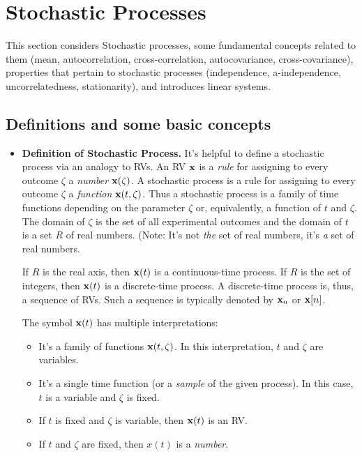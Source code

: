 \documentclass[a4paper, oneside]{book}
\begin{document}
\chapter{Stochastic Processes}

This section considers Stochastic processes, some fundamental concepts related to them (mean, autocorrelation, cross-correlation, autocovariance, cross-covariance), properties that pertain to stochastic processes (independence, a-independence, uncorrelatedness, stationarity), and introduces linear systems. 

\section{Definitions and some basic concepts}
\begin{itemize}
\item \textbf{Definition of Stochastic Process.} It's helpful to define a stochastic process via an analogy to RVs. An RV $\mathbf x$ is a \textit{rule} for assigning to every outcome $\zeta$ a \textit{number} $\mathbf x(\zeta)$. A stochastic process is a rule for assigning to every outcome $\zeta$ a \textit{function} $\mathbf x(t, \zeta)$. Thus a stochastic process is a family of time functions depending on the parameter $\zeta$ or, equivalently, a function of $t$ and $\zeta$. The domain of $\zeta$ is the set of all experimental outcomes and the domain of $t$ is a set $R$ of real numbers. (Note: It's not \textit{the} set of real numbers, it's \textit{a} set of real numbers.

If $R$ is the real axis, then $\mathbf x(t)$ is a continuous-time process. If $R$ is the set of integers, then $\mathbf x(t)$ is a discrete-time process. A discrete-time process is, thus, a sequence of RVs. Such a sequence is typically denoted by $\mathbf x_n$ or $\mathbf x[n]$.

The symbol $\mathbf x(t)$ has multiple interpretations:
\begin{itemize}
\item It's a family of functions $\mathbf x(t,\zeta)$. In this interpretation, $t$ and $\zeta$ are variables.
\item It's a single time function (or a \textit{sample} of the given process). In this case, $t$ is a variable and $\zeta$ is fixed.
\item If $t$ is fixed and $\zeta$ is variable, then $\mathbf x(t)$ is an RV.
\item If $t$ and $\zeta$ are fixed, then $x(t)$ is a \textit{number}.
\end{itemize}


\end{itemize}
\end{document}

